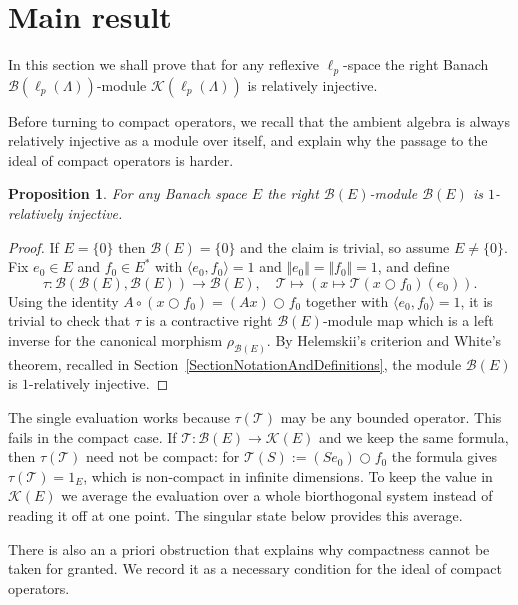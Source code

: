 \documentclass[12pt]{article}
\newtheorem{proposition}[theorem]{Proposition}
\begin{document}
\section{Main result}\label{SecionMainResult}

In this section we shall prove that for any reflexive $\ell_p$-space the 
right Banach $\mathcal{B}(\ell_p(\Lambda))$-module $\mathcal{K}(\ell_p(\Lambda))$ 
is relatively injective.

Before turning to compact operators, we recall that the ambient algebra is 
always relatively injective as a module over itself, and explain why the 
passage to the ideal of compact operators is harder.

\begin{proposition}\label{BEModBEIsRelInj}
    For any Banach space $E$ the right $\mathcal{B}(E)$-module 
    $\mathcal{B}(E)$ is $1$-relatively injective.
\end{proposition}
\begin{proof} If $E=\{0\}$ then $\mathcal{B}(E)=\{0\}$ and the claim is trivial, 
    so assume $E\neq\{0\}$. Fix $e_0\in E$ and $f_0\in E^*$ with 
    $\langle e_0, f_0\rangle = 1$ and $\Vert e_0\Vert=\Vert f_0\Vert=1$, and 
    define
    \[
        \tau:
        \mathcal{B}(\mathcal{B}(E), \mathcal{B}(E))\to\mathcal{B}(E),\quad
        \mathcal{T}\mapsto(x\mapsto \mathcal{T}(x\bigcirc f_0)(e_0)).
    \]
    Using the identity $A\circ(x\bigcirc f_0)=(Ax)\bigcirc f_0$ together with 
    $\langle e_0, f_0\rangle=1$, it is trivial to check that $\tau$ is a 
    contractive right $\mathcal{B}(E)$-module map which is a left inverse for the 
    canonical morphism $\rho_{\mathcal{B}(E)}$. By Helemskii's criterion and 
    White's theorem, recalled in 
    Section~\ref{SectionNotationAndDefinitions}, the module $\mathcal{B}(E)$ 
    is $1$-relatively injective.
\end{proof}

The single evaluation works because $\tau(\mathcal{T})$ may be any bounded 
operator. This fails in the compact case. If 
$\mathcal{T}:\mathcal{B}(E)\to\mathcal{K}(E)$ and we keep the same formula, then 
$\tau(\mathcal{T})$ need not be compact: for $\mathcal{T}(S):=(Se_0)\bigcirc f_0$ 
the formula gives $\tau(\mathcal{T})=1_E$, which is non-compact in infinite 
dimensions. To keep the value in $\mathcal{K}(E)$ we average the evaluation over 
a whole biorthogonal system instead of reading it off at one point. The singular 
state below provides this average.

There is also an a priori obstruction that explains why compactness cannot be 
taken for granted. We record it as a necessary condition for the ideal of 
compact operators.
\end{document}
